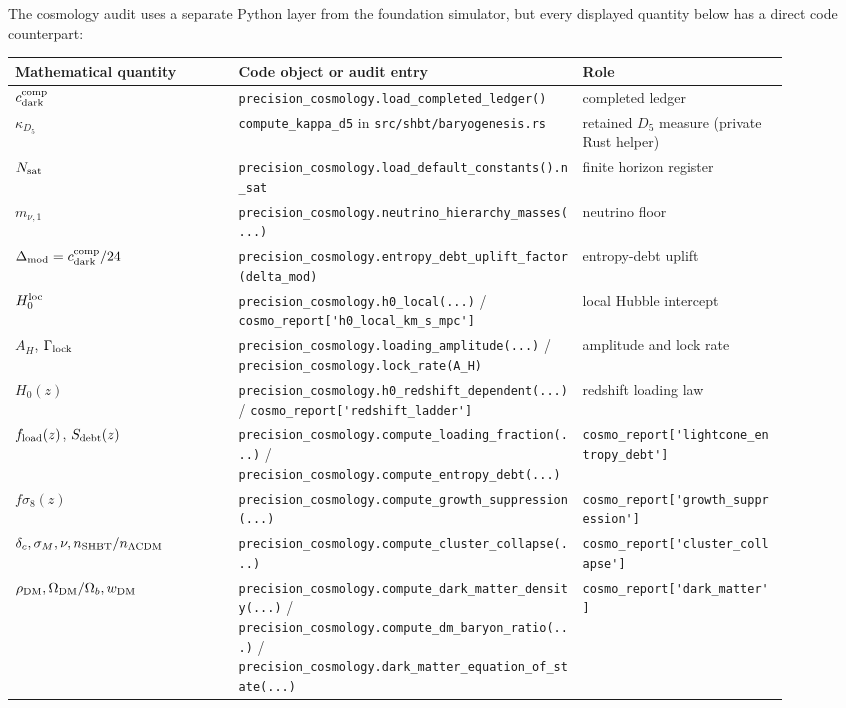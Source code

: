 \documentclass[11pt]{article}
\DeclareRobustCommand{\pyvar}[1]{%
  \ifmmode\text{\nolinkurl{#1}}\else\nolinkurl{#1}\fi%
}
\newcommand{\cdarkcomp}{c_{\rm dark}^{\rm comp}}
\newcommand{\Nsat}{N_{\rm sat}}
\newcommand{\lcdm}{\ensuremath{\Lambda\mathrm{CDM}}}
\newcommand{\hloc}{H_0^{\rm loc}}
\newcommand{\DeltaMod}{\Delta_{\rm mod}}
\newcommand{\fload}{f_{\rm load}}
\newcommand{\debtentropy}{S_{\rm debt}}
\newcommand{\GammaLock}{\Gamma_{\rm lock}}
\newcommand{\AH}{A_H}
\newcommand{\kappad}{\kappa_{D_5}}
\begin{document}
The cosmology audit uses a separate Python layer from the foundation simulator,
but every displayed quantity below has a direct code counterpart:
\begin{table}[htbp]
\centering
\footnotesize
\begin{tabular}{@{}p{0.26\linewidth}p{0.40\linewidth}p{0.24\linewidth}@{}}
\toprule
Mathematical quantity & Code object or audit entry & Role \\
\midrule
\(\cdarkcomp\) & \pyvar{precision_cosmology.load_completed_ledger()} & completed ledger \\
\(\kappad\) & \pyvar{compute_kappa_d5} in \pyvar{src/shbt/baryogenesis.rs} & retained \(D_5\) measure (private Rust helper) \\
\(\Nsat\) & \pyvar{precision_cosmology.load_default_constants().n_sat} & finite horizon register \\
\(m_{\nu,1}\) & \pyvar{precision_cosmology.neutrino_hierarchy_masses(...)} & neutrino floor \\
\(\DeltaMod=\cdarkcomp/24\) & \pyvar{precision_cosmology.entropy_debt_uplift_factor(delta_mod)} & entropy-debt uplift \\
\(\hloc\) & \pyvar{precision_cosmology.h0_local(...)} / \pyvar{cosmo_report['h0_local_km_s_mpc']} & local Hubble intercept \\
\(\AH\), \(\GammaLock\) & \pyvar{precision_cosmology.loading_amplitude(...)} / \pyvar{precision_cosmology.lock_rate(A_H)} & amplitude and lock rate \\
\(H_0(z)\) & \pyvar{precision_cosmology.h0_redshift_dependent(...)} / \pyvar{cosmo_report['redshift_ladder']} & redshift loading law \\
\(\fload(z)\), \(\debtentropy(z)\) & \pyvar{precision_cosmology.compute_loading_fraction(...)} / \pyvar{precision_cosmology.compute_entropy_debt(...)} & \pyvar{cosmo_report['lightcone_entropy_debt']} \\
\(f\sigma_8(z)\) & \pyvar{precision_cosmology.compute_growth_suppression(...)} & \pyvar{cosmo_report['growth_suppression']} \\
\(\delta_c,\sigma_M,\nu,n_{\rm SHBT}/n_{\lcdm}\) & \pyvar{precision_cosmology.compute_cluster_collapse(...)} & \pyvar{cosmo_report['cluster_collapse']} \\
\(\rho_{\rm DM},\Omega_{\rm DM}/\Omega_b,w_{\rm DM}\) & \pyvar{precision_cosmology.compute_dark_matter_density(...)} / \pyvar{precision_cosmology.compute_dm_baryon_ratio(...)} / \pyvar{precision_cosmology.dark_matter_equation_of_state(...)} & \pyvar{cosmo_report['dark_matter']} \\

\end{tabular}
\end{table}
\end{document}
